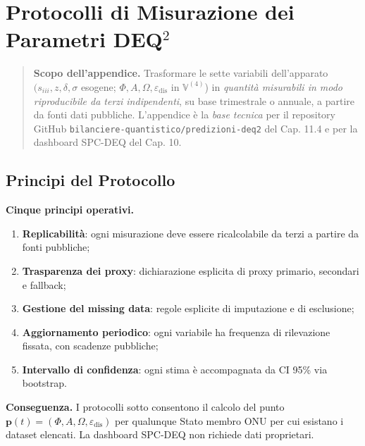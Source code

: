 \chapter{Protocolli di Misurazione dei Parametri
DEQ$^2$}\label{protocolli-di-misurazione-dei-parametri-dequxb2}

\begin{quote}
\textbf{Scopo dell'appendice.} Trasformare le sette variabili
dell'apparato \((s_{iii}, z, \delta, \sigma\) esogene;
\(\Phi, A, \Omega, \varepsilon_{\text{dis}}\) in \(\mathbb{V}^{(4)}\))
in \emph{quantità misurabili in modo riproducibile da terzi
indipendenti}, su base trimestrale o annuale, a partire da fonti dati
pubbliche. L'appendice è la \emph{base tecnica} per il repository GitHub
\texttt{bilanciere-quantistico/predizioni-deq2} del Cap. 11.4 e per la
dashboard SPC-DEQ del Cap. 10.
\end{quote}



\section{Principi del Protocollo}\label{principi-del-protocollo}

\Hypoth{} \textbf{Cinque principi operativi.}

\begin{enumerate}
\def\labelenumi{\arabic{enumi}.}
\tightlist
\item
  \textbf{Replicabilità}: ogni misurazione deve essere ricalcolabile da
  terzi a partire da fonti pubbliche;
\item
  \textbf{Trasparenza dei proxy}: dichiarazione esplicita di proxy
  primario, secondari e fallback;
\item
  \textbf{Gestione del missing data}: regole esplicite di imputazione e
  di esclusione;
\item
  \textbf{Aggiornamento periodico}: ogni variabile ha frequenza di
  rilevazione fissata, con scadenze pubbliche;
\item
  \textbf{Intervallo di confidenza}: ogni stima è accompagnata da CI
  95\% via bootstrap.
\end{enumerate}

\Proved{} \textbf{Conseguenza.} I protocolli sotto consentono il calcolo
del punto
\(\boldsymbol{p}(t) = (\Phi, A, \Omega, \varepsilon_{\text{dis}})\) per
qualunque Stato membro ONU per cui esistano i dataset elencati. La
dashboard SPC-DEQ non richiede dati proprietari.



